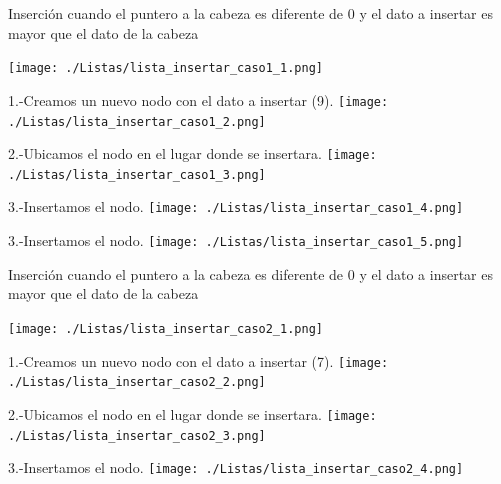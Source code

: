 \documentclass{beamer}
\begin{document}
\begin{frame}
  Inserción cuando el puntero a la cabeza es diferente de  0 y el dato a insertar es mayor que el dato de la cabeza
  
  \texttt{[image: ./Listas/lista\_insertar\_caso1\_1.png]}
  
\end{frame}

\begin{frame}
  1.-Creamos un nuevo nodo con el dato a insertar (9).
  \texttt{[image: ./Listas/lista\_insertar\_caso1\_2.png]}
  
\end{frame}

\begin{frame}
  2.-Ubicamos el nodo en el lugar donde se insertara.
  \texttt{[image: ./Listas/lista\_insertar\_caso1\_3.png]}
  
\end{frame}

\begin{frame}
  3.-Insertamos el nodo.
  \texttt{[image: ./Listas/lista\_insertar\_caso1\_4.png]}
\end{frame}
  
  
\begin{frame}
  3.-Insertamos el nodo.
  \texttt{[image: ./Listas/lista\_insertar\_caso1\_5.png]}  
   
  
\end{frame}



\begin{frame}
  Inserción cuando el puntero a la cabeza es diferente de  0 y el dato a insertar es mayor que el dato de la cabeza
  
  \texttt{[image: ./Listas/lista\_insertar\_caso2\_1.png]}
  
\end{frame}

\begin{frame}
  1.-Creamos un nuevo nodo con el dato a insertar (7).
  \texttt{[image: ./Listas/lista\_insertar\_caso2\_2.png]}
  
\end{frame}

\begin{frame}
  2.-Ubicamos el nodo en el lugar donde se insertara.
  \texttt{[image: ./Listas/lista\_insertar\_caso2\_3.png]}
  
\end{frame}

\begin{frame}
  3.-Insertamos el nodo.
  \texttt{[image: ./Listas/lista\_insertar\_caso2\_4.png]}  
   
  
\end{frame}
\end{document}
